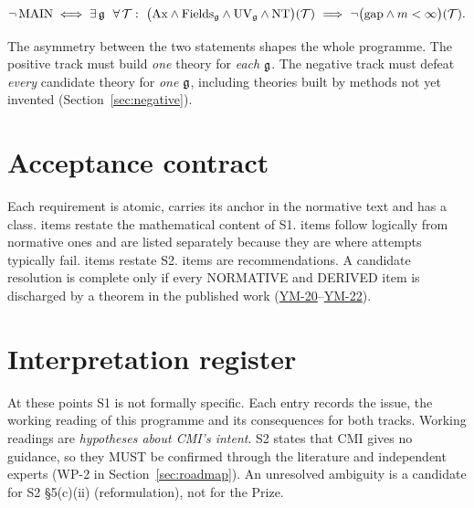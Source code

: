 \documentclass[11pt,a4paper]{article}
\newcommand{\idref}[1]{\hyperref[#1]{\textsf{#1}}}
\begin{document}
\begin{statement}[Negation]\label{st:negation}
\[
\neg\,\mathrm{MAIN}\iff\exists\,\g\ \ \forall\,\cT:\ \bigl(\mathrm{Ax}\wedge\mathrm{Fields}_\g\wedge\mathrm{UV}_\g\wedge\mathrm{NT}\bigr)(\cT)\ \Longrightarrow\ \neg\bigl(\text{gap}\wedge m<\infty\bigr)(\cT).
\]
\end{statement}

The asymmetry between the two statements shapes the whole programme. The positive track must build \emph{one} theory for \emph{each} $\mathfrak g$. The negative track must defeat \emph{every} candidate theory for \emph{one} $\mathfrak g$, including theories built by methods not yet invented (Section~\ref{sec:negative}).

\section{Acceptance contract}\label{sec:contract}

Each requirement is atomic, carries its anchor in the normative text and has a class.  items restate the mathematical content of S1.  items follow logically from normative ones and are listed separately because they are where attempts typically fail.  items restate S2.  items are recommendations. A candidate resolution is complete only if every NORMATIVE and DERIVED item is discharged by a theorem in the published work (\idref{YM-20}--\idref{YM-22}).

{\small}

\section{Interpretation register}\label{sec:interpretations}

At these points S1 is not formally specific. Each entry records the issue, the working reading of this programme and its consequences for both tracks. Working readings are \emph{hypotheses about CMI's intent}. S2 states that CMI gives no guidance, so they MUST be confirmed through the literature and independent experts (WP-2 in Section~\ref{sec:roadmap}). An unresolved ambiguity is a candidate for S2 \S5(c)(ii) (reformulation), not for the Prize.


\end{document}
